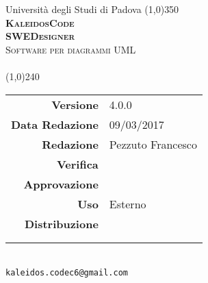\documentclass[a4paper,12pt]{article}
\author{KaleidosCode}
\date{09/03/2017}	%
\begin{document}
	\begin{titlepage}
		\centering Università degli Studi di Padova
		\line(1,0){350}\\
		\vspace{0.4cm}
		{\bfseries\scshape\LARGE KaleidosCode\\}
		\vspace{0.4cm}
		{\bfseries\scshape\LARGE SWEDesigner\\}
		{\scshape\Large Software per diagrammi UML\\}
		\vspace{1cm}
		{\scshape\Large \pianodiqualificai\ \\}		%
		\vspace{1.4cm}
		\logo
		\vspace{1.2cm}
		\line(1,0){240}\\
		\begin{tabular}{r|l}
			{\hfill \textbf{Versione}} 			& 4.0.0\\
			{\hfill \textbf{Data Redazione}} 	& 09/03/2017\\	%
			{\hfill \textbf{Redazione}} 		& Pezzuto Francesco\\	%
			{\hfill \textbf{Verifica}} 			& \\	%
			{\hfill \textbf{Approvazione}} 		& \\	%
			{\hfill \textbf{Uso}} 				& Esterno\\
			{\hfill \textbf{Distribuzione}} 	& \vardanega \\ & \cardin \\ & \proponente\\
		\end{tabular}\\
		\vspace{2cm}
		\texttt{kaleidos.codec6@gmail.com}
	\end{titlepage}
	
	\pagestyle{myfront} 
	\newpage
	
	\newpage
	\tableofcontents
	\newpage
	\listoftables
	\newpage
	\listoffigures
	\newpage
	\pagestyle{mymain}
	
	\newpage
	
	\newpage
	
	\newpage
	
	\appendix
	\newpage
	
	\newpage
	
	
	\label{LastPage}
\end{document}

